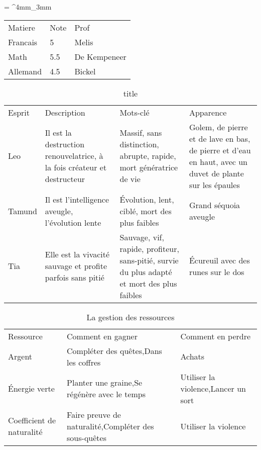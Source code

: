 \documentclass[a4paper, 10pt, oneside, fleqn]{report}
\begin{document}
	
	\everyrow{\tabucline[.4mm  white]{}}
	\tabulinesep = ^4mm_3mm
	
	\begin{tabu}{lll}
		\rowfont{\color{white}\bfseries\sffamily}
		Matiere & Note & Prof\\
		Francais & 5 & Melis\\
		Math & 5.5 & De Kempeneer\\
		Allemand & 4.5 & Bickel\\
	\end{tabu}
	
	
\begin{table}
	\newlength{\tableLength}
	\setlength{\tableLength}{\textwidth+2cm}
	\hspace{-1.9cm}\begin{tabu} to 
		\rowfont{\bfseries\sffamily\leavevmode\color{white}}
		Esprit & Description & Mots-clé & Apparence\\
		Leo & Il est la destruction renouvelatrice, à la fois créateur et destructeur & Massif, sans distinction, abrupte, rapide, mort génératrice de vie & Golem, de pierre et de lave en bas, de pierre et d'eau en haut, avec un duvet de plante sur les épaules\\
		Tamund & Il est l'intelligence aveugle, l'évolution lente & Évolution, lent, ciblé, mort des plus faibles & Grand séquoia aveugle\\
		Tia & Elle est la vivacité sauvage et profite parfois sans pitié & Sauvage, vif, rapide, profiteur, sans-pitié, survie du plus adapté et mort des plus faibles & Écureuil avec des runes sur le dos\\
	\end{tabu}
	\caption{title}
	\end{table}
	
	
	\begin{table}[ht!]
		\begin{tabu} to \textwidth {X X[1.2] X[1.2]}
			\rowfont{\bfseries\sffamily\leavevmode\color{white}}
			Ressource & Comment en gagner & Comment en perdre\\
			Argent & Compléter des quêtes,\newline Dans les coffres & Achats\\
			Énergie verte & Planter une graine,\newline Se régénère avec le temps & Utiliser la violence,\newline Lancer un sort\\
			Coefficient de naturalité & Faire preuve de naturalité,\newline Compléter des sous-quêtes & Utiliser la violence\\
		\end{tabu}
		\caption{La gestion des ressources}
	\end{table}
	
\end{document}

